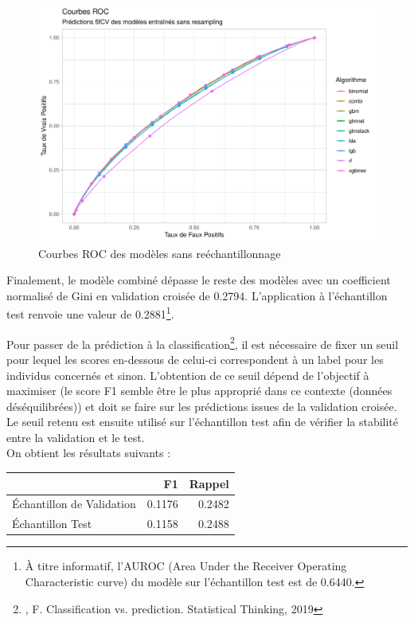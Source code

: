 \documentclass[french]{article}
\begin{document}
\begin{multicols}{2}
\begin{figure}[H] \centering
  \includegraphics[width = \columnwidth]{img/roc_curves}
  \caption{Courbes ROC des modèles sans reéchantillonnage}
\end{figure}

Finalement, le modèle combiné dépasse le reste des modèles avec un coefficient normalisé de Gini en validation croisée de 0.2794. L'application à l'échantillon test renvoie une valeur de 0.2881\footnote{À titre informatif, l'AUROC (Area Under the Receiver Operating Characteristic curve) du modèle sur l'échantillon test est de 0.6440.}.

Pour passer de la prédiction à la classification\footnote{\cite{fhar} , F. Classification vs. prediction. Statistical Thinking, 2019}, il est nécessaire de fixer un seuil pour lequel les scores en-dessous de celui-ci correspondent à un label   \fg{} pour les individus concernés et  \fg{} sinon. L'obtention de ce seuil dépend de l'objectif à maximiser (le score F1 semble être le plus approprié dans ce contexte (données déséquilibrées)) et doit se faire sur les prédictions issues de la validation croisée. Le seuil retenu est ensuite utilisé sur l'échantillon test afin de vérifier la stabilité entre la validation et le test.\\
On obtient les résultats suivants :


\begin{center}\begin{tabular}{|l|r|r|} \hline
  & F1 & Rappel \\ \hline
  Échantillon de Validation & 0.1176 & 0.2482 \\
  Échantillon Test & 0.1158 & 0.2488 \\ \hline
\end{tabular}\end{center}


\end{multicols}
\end{document}
